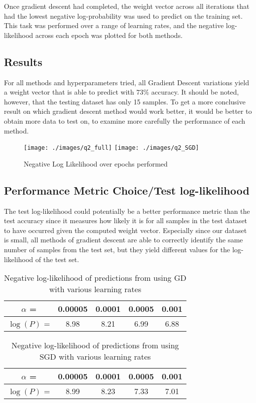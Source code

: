 \documentclass{article}
\begin{document}
Once gradient descent had completed, the weight vector across all iterations that had the lowest negative log-probability was used to predict on the training set. This task was performed over a range of learning rates, and the negative log-likelihood across each epoch was plotted for both methods.

\subsection{Results}
For all methods and hyperparameters tried, all Gradient Descent variations yield a weight vector that is able to predict with $73\%$ accuracy. It should be noted, however, that the testing dataset has only 15 samples. To get a more conclusive result on which gradient descent method would work better, it would be better to obtain more data to test on, to examine more carefully the performance of each method.

\begin{figure}[H]
\centering
\texttt{[image: ./images/q2\_full]}
\texttt{[image: ./images/q2\_SGD]}
\caption{Negative Log Likelihood over epochs performed}
\end{figure}

\subsection{Performance Metric Choice/Test log-likelihood}
The test log-likelihood could potentially be a better performance metric than the test accuracy since it measures how likely it is for all samples in the test dataset to have occurred given the computed weight vector. Especially since our dataset is small, all methods of gradient descent are able to correctly identify the same number of samples from the test set, but they yield different values for the log-likelihood of the test set.

\begin{table}
\begin{center}
\begin{tabular}{|c|c|c|c|c|}
\hline
$\alpha$ =& 0.00005 & 0.0001 & 0.0005 & 0.001\\ \hline
$\log(P)$ = &8.98&8.21&6.99&6.88 \\ \hline
\hline
\end{tabular}
\caption{Negative log-likelihood of predictions from using GD with various learning rates}
\end{center}
\end{table}

\begin{table}
\begin{center}
\begin{tabular}{|c|c|c|c|c|}
\hline
$\alpha$ =& 0.00005 & 0.0001 & 0.0005 & 0.001\\ \hline
$\log(P)$ = &8.99&8.23&7.33&7.01 \\ \hline
\hline
\end{tabular}
\caption{Negative log-likelihood of predictions from using SGD with various learning rates}
\end{center}
\end{table}
\end{document}
